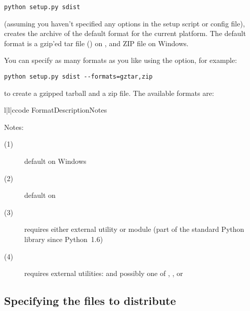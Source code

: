 \documentclass{howto}
\begin{document}
\begin{verbatim}
python setup.py sdist
\end{verbatim}

(assuming you haven't specified any  options in the setup
script or config file),  creates the archive of the
default format for the current platform.  The default format is a gzip'ed
tar file () on \UNIX, and ZIP file on Windows.

You can specify as many formats as you like using the
 option, for example:

\begin{verbatim}
python setup.py sdist --formats=gztar,zip
\end{verbatim}

to create a gzipped tarball and a zip file.  The available formats are:
\begin{tableiii}{l|l|c}{code}%
  {Format}{Description}{Notes}
\end{tableiii}

\noindent Notes:
\begin{description}
\item[(1)] default on Windows
\item[(2)] default on \UNIX
\item[(3)] requires either external  utility or
   module (part of the standard Python library since
  Python~1.6)
\item[(4)] requires external utilities:  and possibly one
  of , , or 
\end{description}



\subsection{Specifying the files to distribute}
\label{manifest}
\end{document}

